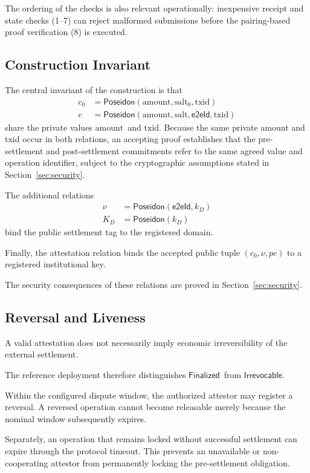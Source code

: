 \documentclass[10pt,twocolumn]{article}
\newcommand{\Poseidon}{\ensuremath{\mathsf{Poseidon}}}
\newcommand{\eeid}{\ensuremath{\mathsf{e2eId}}}
\newcommand{\amount}{\ensuremath{\text{amount}}}
\newcommand{\txid}{\ensuremath{\text{txid}}}
\newcommand{\salt}{\ensuremath{\text{salt}}}
\newcommand{\pc}{\ensuremath{\mathit{pc}}}
\newcommand{\Finalized}{\ensuremath{\mathsf{Finalized}}}
\newcommand{\Irrevocable}{\ensuremath{\mathsf{Irrevocable}}}
\begin{document}
The ordering of the checks is also relevant operationally: inexpensive
receipt and state checks (1--7) can reject malformed submissions before
the pairing-based proof verification (8) is executed.

\subsection{Construction Invariant}
\label{sec:invariant}

The central invariant of the construction is that
\[
\begin{aligned}
c_0 &= \Poseidon(\amount,\salt_0,\txid) \\
c &= \Poseidon(\amount,\salt,\eeid,\txid)
\end{aligned}
\]
share the private values \amount\ and \txid. Because the same private
amount and txid occur in both relations, an accepting proof establishes
that the pre-settlement and post-settlement commitments refer to the
same agreed value and operation identifier, subject to the cryptographic
assumptions stated in Section~\ref{sec:security}.

The additional relations
\[
\begin{aligned}
\nu &= \Poseidon(\eeid,k_D) \\
K_D &= \Poseidon(k_D)
\end{aligned}
\]
bind the public settlement tag to the registered domain.

Finally, the attestation relation binds the accepted public tuple
$(c_0,\nu,\pc)$ to a registered institutional key.

The security consequences of these relations are proved in
Section~\ref{sec:security}.

\subsection{Reversal and Liveness}
\label{sec:reversal}

A valid attestation does not necessarily imply economic irreversibility
of the external settlement.

The reference deployment therefore distinguishes \Finalized\ from
\Irrevocable.

Within the configured dispute window, the authorized attestor may
register a reversal. A reversed operation cannot become releasable merely
because the nominal window subsequently expires.

Separately, an operation that remains locked without successful
settlement can expire through the protocol timeout. This prevents an
unavailable or non-cooperating attestor from permanently locking the
pre-settlement obligation.
\end{document}
